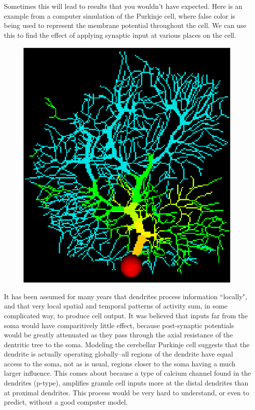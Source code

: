 \documentclass[12pt]{article}
\begin{document}
Sometimes this will lead to results that you wouldn't have expected. Here is an example from a computer simulation of the Purkinje cell, where false color is being used to represent the membrane potential throughout the cell. We can use this to find the effect of applying synaptic input at various places on the cell.

\begin{figure}[h]
  \centering
 \includegraphics[scale=0.5]{figures/colpurk.eps}
  \label{fig:colpurk}
\end{figure}

It has been assumed for many years that dendrites process information ``locally", and that very local spatial and temporal patterns of activity sum, in some complicated way, to produce cell output. It was believed that inputs far from the soma would have comparitively little effect, because post-synaptic potentials would be greatly attenuated as they pass through the axial resistance of the dentritic tree to the soma. Modeling the cerebellar Purkinje cell suggests that the dendrite is actually operating globally--all regions of the dendrite have equal access to the soma, not as is usual, regions closer to the soma having a much larger influence. This comes about because a type of calcium channel found in the dendrites (p-type), amplifies granule cell inputs more at the distal dendrites than at proximal dendrites. This process would be very hard to understand, or even to predict, without a good computer model.
\end{document}
